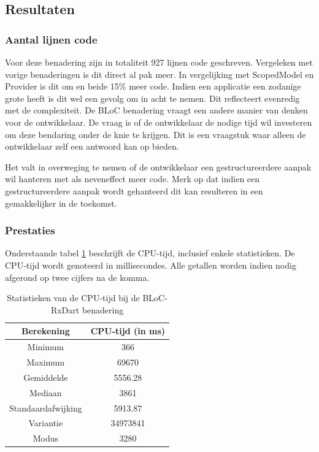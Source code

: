 \subsection{Resultaten}
\subsubsection{Aantal lijnen code}
Voor deze benadering zijn in totaliteit 927 lijnen code geschreven. Vergeleken met vorige benaderingen is dit direct al pak meer. In vergelijking met ScopedModel en Provider is dit om en beide 15\% meer code. Indien een applicatie een zodanige grote heeft is dit wel een gevolg om in acht te nemen. Dit reflecteert evenredig met de complexiteit. De BLoC benadering vraagt een andere manier van denken voor de ontwikkelaar. De vraag is of de ontwikkelaar de nodige tijd wil investeren om deze bendaring onder de knie te krijgen. Dit is een vraagstuk waar alleen de ontwikkelaar zelf een antwoord kan op bieden.

Het valt in overweging te nemen of de ontwikkelaar een gestructureerdere aanpak wil hanteren met als neveneffect meer code. Merk op dat indien een gestructureerdere aanpak wordt gehanteerd dit kan resulteren in een gemakkelijker in de toekomst. 
\subsubsection{Prestaties}
Onderstaande tabel \ref{table:experiment-bloc-rxdart-statistics} beschrijft de CPU-tijd, inclusief enkele statistieken. De CPU-tijd wordt genoteerd in millisecondes. Alle getallen worden indien nodig afgerond op twee cijfers na de komma.
\begin{table}[H]
    \centering
    \begin{tabular}{c|c}
        \textbf{Berekening} & \textbf{CPU-tijd (in ms)} \\ \hline
        Minimum             & 366                       \\ \hline
        Maximum             & 69670                     \\ \hline
        Gemiddelde          & 5556.28                   \\ \hline
        Mediaan             & 3861                      \\ \hline
        Standaardafwijking  & 5913.87                   \\ \hline
        Variantie           & 34973841                  \\ \hline
        Modus               & 3280                      \\                
    \end{tabular}
    \caption{Statistieken van de CPU-tijd bij de BLoC-RxDart benadering}
    \label{table:experiment-bloc-rxdart-statistics}
\end{table}


